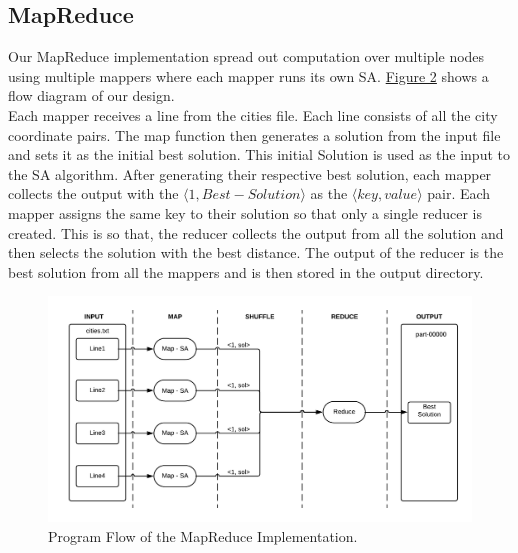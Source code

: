 \documentclass{article}
\begin{document}
		\subsection{MapReduce} \label{D_MR}
		    Our MapReduce implementation spread out computation over multiple nodes using multiple mappers where each mapper runs its own SA. \hyperref[F2]{Figure 2} shows a flow diagram of our design. \\
			
			Each mapper receives a line from the cities file. Each line consists of all the city coordinate pairs. The map function then generates a solution from the input file and sets it as the initial best solution. This initial Solution is used as the input to the SA algorithm. After generating their respective best solution, each mapper collects the output with the $\langle1, Best-Solution\rangle$ as the $\langle key, value\rangle$ pair. Each mapper assigns the same key to their solution so that only a single reducer is created. This is so that, the reducer collects the output from all the solution and then selects the solution with the best distance. The output of the reducer is the best solution from all the mappers and is then stored in the output directory.
			
			\begin{figure}\label{F2}
				\caption{Program Flow of the MapReduce Implementation.}
				\centering
				\includegraphics[scale=0.6]{mapreduce_flow.png}
			\end{figure}
		
\end{document}
